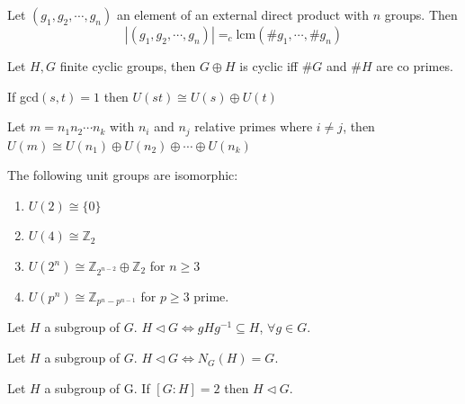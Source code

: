 \begin{assignment}[
  header=HeaderA,
  body=BodyA,
  title={Proved Theorems in  Group Theory},
  duedate={\today},
  toc=false,
  toctitle={This appears on the Table of contents.},
  exlist=false
]
\begin{mtheorem}[33][][thm:33]
Let $(g_1, g_2, \cdots, g_n)$ an element of an external direct product with $n$ groups. Then 
\[
|(g_1, g_2, \cdots, g_n)| =_c \text{lcm}(\#g_1,\cdots, \# g_n)
\]
\end{mtheorem}

\begin{mtheorem}[34][][thm:34]
Let $H,G$ finite cyclic groups, then $G \oplus H$ is cyclic iff $\# G$  and $\# H$ are co primes.  
\end{mtheorem}

\begin{mtheorem}[35][][thm:35]
If gcd$(s,t) = 1$ then $U(st) \cong U(s) \oplus U(t)$
\end{mtheorem}

\begin{mcorollary}[35a][][cor:35a]
Let $m = n_1 n_2\cdots n_k$ with $n_i$ and $n_j$ relative primes where $i \neq j$, then $U(m) \cong U(n_1) \oplus U(n_2) \oplus \cdots \oplus U(n_k)$
\end{mcorollary}

\begin{mcorollary}[35b][][cor:35b]
The following unit groups are isomorphic:
\begin{enumerate}
    \item[i)] $U(2) \cong \{0\}$
    \item[ii)] $U(4) \cong \mathbb{Z}_2$
    \item[iii)] $U(2^n) \cong \mathbb{Z}_{2^{n-2}} \oplus \mathbb{Z}_2$ for $n \geq 3$
    \item[iv)] $U(p^n) \cong \mathbb{Z}_{p^n - p^{n-1}}$ for $p \geq 3$ prime.  
\end{enumerate}
\end{mcorollary}


\begin{mtheorem}
Let $H$ a subgroup of $G$. $H \lhd G \iff gHg^{-1} \subseteq H$, $\forall g \in G$.
\end{mtheorem}

\begin{mtheorem}[37][][thm:37]
Let $H$ a subgroup of $G$. $H \lhd G \iff N_G(H) = G$.
\end{mtheorem}

\begin{mtheorem}[38][][thm:38]
Let $H$ a subgroup of G. If $[G:H] = 2$ then $H \lhd G$.
\end{mtheorem}


\end{assignment}
